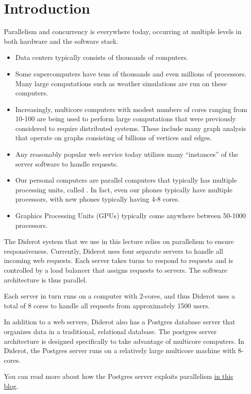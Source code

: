 \chapter{Introduction}

Parallelism and concurrency is everywhere today, occurring at multiple levels in both hardware and the software stack.  
%
\begin{itemize}
\item Data centers typically consists of thousands of computers.

\item Some supercomputers have tens of thousands and even millions of processors.  Many large computations such as weather simulations are run on these computers.

\item  Increasingly, multicore computers with modest numbers of cores ranging from 10-100 are being used to perform large computations that were previously considered to require distributed systems.  These include many graph analysis that operate on graphs consisting of billions of vertices and edges. 

\item  Any reasonably popular web service today utilizes many ``instances'' of the server software to handle requests.

\item  Our personal computers are parallel computers that typically has multiple processing units, called .
%
In fact, even our phones typically have multiple processors, with new phones typically having 4-8 cores.

\item Graphics Processing Units (GPUs) typically come anywhere between 50-1000 processors.
\end{itemize} 


\begin{example}
The Diderot system that we use in this lecture relies on parallelism
to ensure responsiveness.  
%
Currently, Diderot uses four separate servers to handle all incoming web requests.
%
Each server takes turns to respond to requests and is controlled by a load balancer that assigns requests to servers.
%
The software architecture is thus parallel.

Each server in turn runs on a computer with 2-cores, and thus Diderot uses a total of $8$ cores to handle all requests from approximately 1500 users.
%

In addition to a web servers, Diderot also has a Postgres database server that organizes data in a traditional, relational database.  
%
The postgres server architecture is designed specifically to take advantage of multicore computers.
%
In Diderot, the Postgres server runs on a  relatively large multicore machine with 8-cores.   

You can read more about how the Postgres server exploits parallelism
%
\href{https://www.percona.com/blog/2019/02/21/parallel-queries-in-postgresql/}
{in this blog}.
\end{example}



